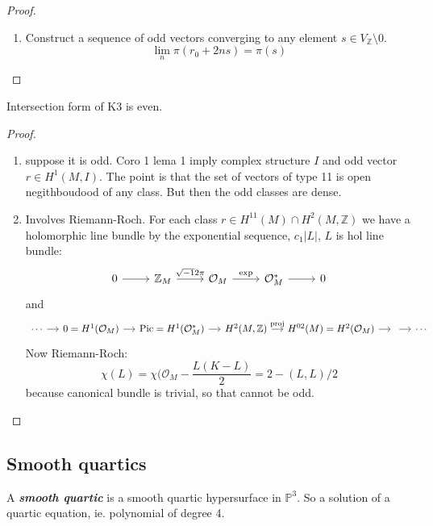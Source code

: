 \begin{proof}\leavevmode 
	\begin{enumerate}[label=\textbf{Step \arabic*}]
		\item Construct a sequence of odd vectors converging to any element $s\in V_{\mathbb{Z}}\setminus 0$.
			\[\lim_n\pi(r_0+2ns)=\pi(s)\]
	\end{enumerate}
\end{proof}

\begin{thm}
	Intersection form of K3 is even.
\end{thm}

\begin{proof}
	\begin{enumerate}[label=\textbf{Step \arabic*}]
		\item suppose it is odd. Coro 1 lema 1 imply complex structure $I$ and odd vector $r\in H^{1}(M,I)$. The point is that the set of vectors of type 11 is open negithboudood of any class. But then the odd classes are dense.

		\item Involves Riemann-Roch. For each class $r\in H^{11}(M)\cap H^{2}(M,\mathbb{Z})$ we have a holomorphic line bundle by the exponential sequence, $c_1|L|$, $L$ is hol line bundle:
			\[\begin{tikzcd}
				0\arrow[r]&\mathbb{Z}_M\arrow[r,"\sqrt{-1}2\pi"]&\mathcal{O}_M\arrow[r,"\operatorname{exp}"]&\mathcal{O}^*_M\arrow[r]&0
			\end{tikzcd}\]
			and
			\[\begin{tikzcd}[column sep=small]
				\cdots\arrow[r]&0=H^{1}(\mathcal{O}_M)\arrow[r]&\operatorname{Pic}= H^{1}(\mathcal{O}^*_M)\arrow[r]&H^{2}(M,\mathbb{Z})\arrow[r,"\operatorname{proj}"]&H^{02}(M)=H^{2}(\mathcal{O}_M)\arrow[r]&\arrow[r]&\cdots
			\end{tikzcd}\]
			Now Riemann-Roch:
			\[\chi(L)=\chi(\mathcal{O}_M-\frac{L(K-L)}{2}=2-(L,L)/2\]
			because canonical bundle is trivial, so that cannot be odd.
	\end{enumerate}
\end{proof}

\subsection{Smooth quartics}

\begin{defn}
	A \textit{\textbf{smooth quartic}} is a smooth quartic hypersurface in  $\mathbb{P}^3$. So a solution of a quartic equation, ie. polynomial of degree 4.
\end{defn}

